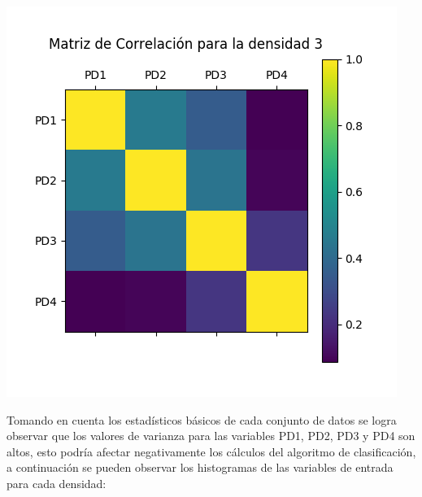 \includegraphics[scale=0.5]{correlacionD3.jpg}

Tomando en cuenta los estadísticos básicos de cada conjunto de datos se logra observar
que los valores de varianza para las variables PD1, PD2, PD3 y PD4 son altos, esto podría afectar
negativamente los cálculos del algoritmo de clasificación, a continuación se pueden observar los
histogramas de las variables de entrada para cada densidad:

